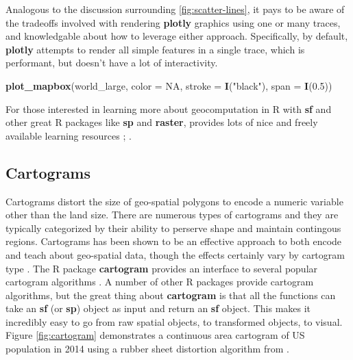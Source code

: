 \documentclass[
  12pt,
]{krantz}
\newenvironment{Shaded}{\begin{snugshade}}{\end{snugshade}}
\newcommand{\CommentTok}[1]{\textcolor[rgb]{0.56,0.35,0.01}{\textit{#1}}}
\newcommand{\DataTypeTok}[1]{\textcolor[rgb]{0.13,0.29,0.53}{#1}}
\newcommand{\FloatTok}[1]{\textcolor[rgb]{0.00,0.00,0.81}{#1}}
\newcommand{\KeywordTok}[1]{\textcolor[rgb]{0.13,0.29,0.53}{\textbf{#1}}}
\newcommand{\NormalTok}[1]{#1}
\newcommand{\OperatorTok}[1]{\textcolor[rgb]{0.81,0.36,0.00}{\textbf{#1}}}
\newcommand{\OtherTok}[1]{\textcolor[rgb]{0.56,0.35,0.01}{#1}}
\newcommand{\StringTok}[1]{\textcolor[rgb]{0.31,0.60,0.02}{#1}}
\begin{document}
\begin{Shaded}
\end{Shaded}

Analogous to the discussion surrounding \ref{fig:scatter-lines}, it pays to be aware of the tradeoffs involved with rendering \textbf{plotly} graphics using one or many traces, and knowledgable about how to leverage either approach. Specifically, by default, \textbf{plotly} attempts to render all simple features in a single trace, which is performant, but doesn't have a lot of interactivity.

\begin{Shaded}
\begin{Highlighting}[]
\KeywordTok{plot_mapbox}\NormalTok{(world_large, }\DataTypeTok{color =} \OtherTok{NA}\NormalTok{, }\DataTypeTok{stroke =} \KeywordTok{I}\NormalTok{(}\StringTok{"black"}\NormalTok{), }\DataTypeTok{span =} \KeywordTok{I}\NormalTok{(}\FloatTok{0.5}\NormalTok{))}
\end{Highlighting}
\end{Shaded}

For those interested in learning more about geocomputation in R with \textbf{sf} and other great R packages like \textbf{sp} and \textbf{raster}, \citet{geocomputation} provides lots of nice and freely available learning resources \citep{sp}; \citep{raster}.

\hypertarget{cartograms}{%
\subsection{Cartograms}\label{cartograms}}

Cartograms distort the size of geo-spatial polygons to encode a numeric variable other than the land size. There are numerous types of cartograms and they are typically categorized by their ability to perserve shape and maintain contingous regions. Cartograms has been shown to be an effective approach to both encode and teach about geo-spatial data, though the effects certainly vary by cartogram type \citep{cartogram-vis}.
The R package \textbf{cartogram} provides an interface to several popular cartogram algorithms \citep{cartogram}. A number of other R packages provide cartogram algorithms, but the great thing about \textbf{cartogram} is that all the functions can take an \textbf{sf} (or \textbf{sp}) object as input and return an \textbf{sf} object. This makes it incredibly easy to go from raw spatial objects, to transformed objects, to visual. Figure \ref{fig:cartogram} demonstrates a continuous area cartogram of US population in 2014 using a rubber sheet distortion algorithm from \citet{Dougenik}.
\end{document}
